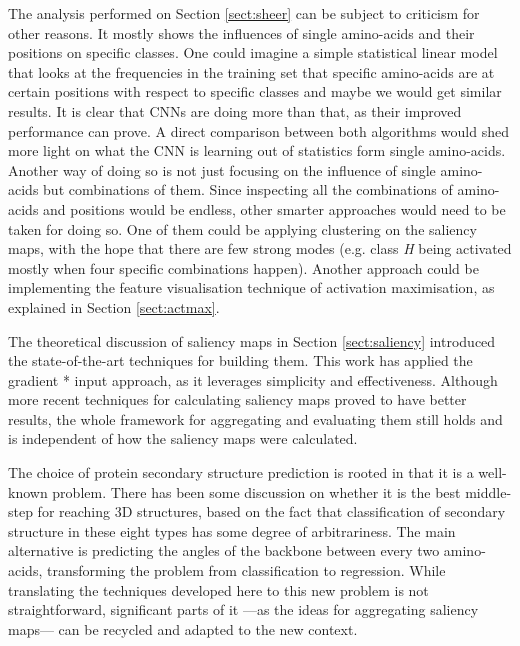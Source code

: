 The analysis performed on Section \ref{sect:sheer} can be subject to criticism for other reasons. It mostly shows the influences of single amino-acids and their positions on specific classes. One could imagine a simple statistical linear model that looks at the frequencies in the training set that specific amino-acids are at certain positions with respect to specific classes and maybe we would get similar results. It is clear that CNNs are doing more than that, as their improved performance can prove. A direct comparison between both algorithms would shed more light on what the CNN is learning out of statistics form single amino-acids. Another way of doing so is not just focusing on the influence of single amino-acids but combinations of them. Since inspecting all the combinations of amino-acids and positions would be endless, other smarter approaches would need to be taken for doing so. One of them could be applying clustering on the saliency maps, with the hope that there are few strong modes (e.g. class \textit{H} being activated mostly when four specific combinations happen). Another approach could be implementing the feature visualisation technique of activation maximisation, as explained in Section \ref{sect:actmax}.

The theoretical discussion of saliency maps in Section \ref{sect:saliency} introduced the state-of-the-art techniques for building them. This work has applied the gradient * input approach, as it leverages simplicity and effectiveness. Although more recent techniques for calculating saliency maps proved to have better results, the whole framework for aggregating and evaluating them still holds and is independent of how the saliency maps were calculated.

The choice of protein secondary structure prediction is rooted in that it is a well-known problem. There has been some discussion on whether it is the best middle-step for reaching 3D structures, based on the fact that classification of secondary structure in these eight types has some degree of arbitrariness. The main alternative is predicting the angles of the backbone between every two amino-acids, transforming the problem from classification to regression. While translating the techniques developed here to this new problem is not straightforward, significant parts of it ---as the ideas for aggregating saliency maps--- can be recycled and adapted to the new context.

